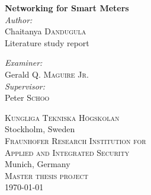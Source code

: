 \begin{titlepage}
\begin{center}



{ \huge \bfseries Networking for Smart Meters}\\[0.4cm]
\emph{Author:}\\
Chaitanya \textsc{Dandugula}\\
{\large Literature study report}



\emph{Examiner:} \\
Gerald \textsc{Q. Maguire Jr.}\\
\emph{Supervisor:} \\
Peter \textsc{Schoo}

\vfill

\textsc{\LARGE Kungliga Tekniska H\"ogskolan}\\
{\large Stockholm, Sweden}\\[1.5cm]
\textsc{\LARGE Fraunhofer Research Institution for}\\ [0.25cm]
\textsc{\LARGE Applied and Integrated Security}\\
{\large Munich, Germany}\\[1.5cm]
\textsc{\Large Master thesis project}\\[0.5cm]
{\large \today}

\end{center}

\end{titlepage}
